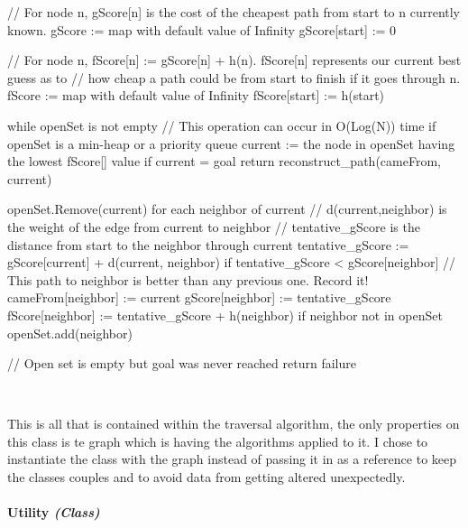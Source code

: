 \begin{FlushLeft}
\begin{pseudocode}
    // For node n, gScore[n] is the cost of the cheapest path from start to n currently known.
    gScore := map with default value of Infinity
    gScore[start] := 0

    // For node n, fScore[n] := gScore[n] + h(n). fScore[n] represents our current best guess as to
    // how cheap a path could be from start to finish if it goes through n.
    fScore := map with default value of Infinity
    fScore[start] := h(start)

    while openSet is not empty
        // This operation can occur in O(Log(N)) time if openSet is a min-heap or a priority queue
        current := the node in openSet having the lowest fScore[] value
        if current = goal
            return reconstruct_path(cameFrom, current)

        openSet.Remove(current)
        for each neighbor of current
            // d(current,neighbor) is the weight of the edge from current to neighbor
            // tentative_gScore is the distance from start to the neighbor through current
            tentative_gScore := gScore[current] + d(current, neighbor)
            if tentative_gScore < gScore[neighbor]
                // This path to neighbor is better than any previous one. Record it!
                cameFrom[neighbor] := current
                gScore[neighbor] := tentative_gScore
                fScore[neighbor] := tentative_gScore + h(neighbor)
                if neighbor not in openSet
                    openSet.add(neighbor)

    // Open set is empty but goal was never reached
    return failure
    \end{pseudocode} \\ \BK

    This is all that is contained within the traversal algorithm, the only properties on this class is te graph which is having the algorithms applied to it. I chose to instantiate the class with the graph instead of passing it in as a reference to keep the classes couples and to avoid data from getting altered unexpectedly.
    \bk

    \pagebreak
\paragraph{Utility \textit{(Class)}} \mbox{} \\


\end{FlushLeft}
